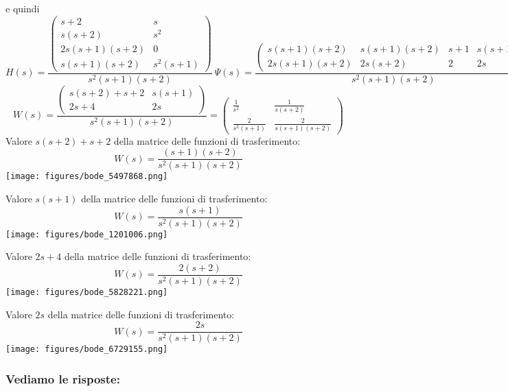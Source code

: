\documentclass{article}
\begin{document}
e quindi \[ H(s)  =  \frac{\left(\begin{matrix}s + 2 & s\\s \left(s + 2\right) & s^{2}\\2 s \left(s + 1\right) \left(s + 2\right) & 0\\s \left(s + 1\right) \left(s + 2\right) & s^{2} \left(s + 1\right)\end{matrix}\right)}{s^{2} \left(s + 1\right) \left(s + 2\right)} \ \Psi(s) = \frac{\left(\begin{matrix}s \left(s + 1\right) \left(s + 2\right) & s \left(s + 1\right) \left(s + 2\right) & s + 1 & s \left(s + 1\right)\\2 s \left(s + 1\right) \left(s + 2\right) & 2 s \left(s + 2\right) & 2 & 2 s\end{matrix}\right)}{s^{2} \left(s + 1\right) \left(s + 2\right)} \]
\[ W(s)  =  \frac{\left(\begin{matrix}s \left(s + 2\right) + s + 2 & s \left(s + 1\right)\\2 s + 4 & 2 s\end{matrix}\right)}{s^{2} \left(s + 1\right) \left(s + 2\right)} = \left(\begin{matrix}\frac{1}{s^{2}} & \frac{1}{s \left(s + 2\right)}\\\frac{2}{s^{2} \left(s + 1\right)} & \frac{2}{s \left(s + 1\right) \left(s + 2\right)}\end{matrix}\right)  \] 
Valore $ s \left(s + 2\right) + s + 2 $ della matrice delle funzioni di trasferimento:
\[ W(s) = \frac{\left(s + 1\right) \left(s + 2\right)}{s^{2} \left(s + 1\right) \left(s + 2\right)} \]\texttt{[image: figures/bode\_5497868.png]}


Valore $ s \left(s + 1\right) $ della matrice delle funzioni di trasferimento:
\[ W(s) = \frac{s \left(s + 1\right)}{s^{2} \left(s + 1\right) \left(s + 2\right)} \]\texttt{[image: figures/bode\_1201006.png]}


Valore $ 2 s + 4 $ della matrice delle funzioni di trasferimento:
\[ W(s) = \frac{2 \left(s + 2\right)}{s^{2} \left(s + 1\right) \left(s + 2\right)} \]\texttt{[image: figures/bode\_5828221.png]}


Valore $ 2 s $ della matrice delle funzioni di trasferimento:
\[ W(s) = \frac{2 s}{s^{2} \left(s + 1\right) \left(s + 2\right)} \]\texttt{[image: figures/bode\_6729155.png]}


\subsubsection{Vediamo le risposte:} 
\end{document}
